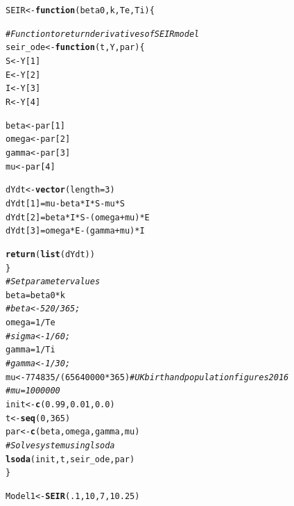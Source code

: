 \documentclass{article}\usepackage[]{graphicx}\usepackage[]{color}
\makeatletter
\newcommand{\hlnum}[1]{\textcolor[rgb]{0.686,0.059,0.569}{#1}}%
\newcommand{\hlcom}[1]{\textcolor[rgb]{0.678,0.584,0.686}{\textit{#1}}}%
\newcommand{\hlopt}[1]{\textcolor[rgb]{0,0,0}{#1}}%
\newcommand{\hlstd}[1]{\textcolor[rgb]{0.345,0.345,0.345}{#1}}%
\newcommand{\hlkwa}[1]{\textcolor[rgb]{0.161,0.373,0.58}{\textbf{#1}}}%
\newcommand{\hlkwb}[1]{\textcolor[rgb]{0.69,0.353,0.396}{#1}}%
\newcommand{\hlkwc}[1]{\textcolor[rgb]{0.333,0.667,0.333}{#1}}%
\newcommand{\hlkwd}[1]{\textcolor[rgb]{0.737,0.353,0.396}{\textbf{#1}}}%
\newenvironment{kframe}{%
 \def\at@end@of@kframe{}%
 \ifinner\ifhmode%
  \def\at@end@of@kframe{\end{minipage}}%
  \begin{minipage}{\columnwidth}%
 \fi\fi%
 \def\FrameCommand##1{\hskip\@totalleftmargin \hskip-\fboxsep
 \colorbox{shadecolor}{##1}\hskip-\fboxsep
     \hskip-\linewidth \hskip-\@totalleftmargin \hskip\columnwidth}%
 \MakeFramed {\advance\hsize-\width
   \@totalleftmargin\z@ \linewidth\hsize
   \@setminipage}}%
 {\par\unskip\endMakeFramed%
 \at@end@of@kframe}
\newenvironment{knitrout}{}{} %
\makeatother
\begin{document}
\begin{knitrout}
\color{fgcolor}\begin{kframe}
\begin{alltt}
\hlstd{SEIR} \hlkwb{<-} \hlkwa{function}\hlstd{(}\hlkwc{beta0}\hlstd{,} \hlkwc{k}\hlstd{,} \hlkwc{Te}\hlstd{,} \hlkwc{Ti}\hlstd{)\{}

\hlcom{# Function to return derivatives of SEIR model}
\hlstd{seir_ode}\hlkwb{<-}\hlkwa{function}\hlstd{(}\hlkwc{t}\hlstd{,}\hlkwc{Y}\hlstd{,}\hlkwc{par}\hlstd{)\{}
  \hlstd{S}\hlkwb{<-}\hlstd{Y[}\hlnum{1}\hlstd{]}
  \hlstd{E}\hlkwb{<-}\hlstd{Y[}\hlnum{2}\hlstd{]}
  \hlstd{I}\hlkwb{<-}\hlstd{Y[}\hlnum{3}\hlstd{]}
  \hlstd{R}\hlkwb{<-}\hlstd{Y[}\hlnum{4}\hlstd{]}

  \hlstd{beta}\hlkwb{<-}\hlstd{par[}\hlnum{1}\hlstd{]}
  \hlstd{omega}\hlkwb{<-}\hlstd{par[}\hlnum{2}\hlstd{]}
  \hlstd{gamma}\hlkwb{<-}\hlstd{par[}\hlnum{3}\hlstd{]}
  \hlstd{mu}\hlkwb{<-}\hlstd{par[}\hlnum{4}\hlstd{]}

  \hlstd{dYdt}\hlkwb{<-}\hlkwd{vector}\hlstd{(}\hlkwc{length}\hlstd{=}\hlnum{3}\hlstd{)}
  \hlstd{dYdt[}\hlnum{1}\hlstd{]}\hlkwb{=}\hlstd{mu}\hlopt{-}\hlstd{beta}\hlopt{*}\hlstd{I}\hlopt{*}\hlstd{S}\hlopt{-}\hlstd{mu}\hlopt{*}\hlstd{S}
  \hlstd{dYdt[}\hlnum{2}\hlstd{]}\hlkwb{=}\hlstd{beta}\hlopt{*}\hlstd{I}\hlopt{*}\hlstd{S}\hlopt{-}\hlstd{(omega}\hlopt{+}\hlstd{mu)}\hlopt{*}\hlstd{E}
  \hlstd{dYdt[}\hlnum{3}\hlstd{]}\hlkwb{=}\hlstd{omega}\hlopt{*}\hlstd{E}\hlopt{-}\hlstd{(gamma}\hlopt{+}\hlstd{mu)}\hlopt{*}\hlstd{I}

  \hlkwd{return}\hlstd{(}\hlkwd{list}\hlstd{(dYdt))}
\hlstd{\}}
  \hlcom{# Set parameter values}
\hlstd{beta} \hlkwb{=} \hlstd{beta0}\hlopt{*}\hlstd{k}
\hlcom{#beta<-520/365;}
\hlstd{omega} \hlkwb{=} \hlnum{1}\hlopt{/}\hlstd{Te}
\hlcom{# sigma<-1/60;}
\hlstd{gamma} \hlkwb{=} \hlnum{1}\hlopt{/}\hlstd{Ti}
\hlcom{# gamma<-1/30;}
\hlstd{mu}\hlkwb{<-}\hlnum{774835}\hlopt{/}\hlstd{(}\hlnum{65640000}\hlopt{*}\hlnum{365}\hlstd{)} \hlcom{# UK birth and population figures 2016}
\hlcom{# mu=1000000}
\hlstd{init}\hlkwb{<-}\hlkwd{c}\hlstd{(}\hlnum{0.99}\hlstd{,}\hlnum{0.01}\hlstd{,}\hlnum{0.0}\hlstd{)}
\hlstd{t}\hlkwb{<-}\hlkwd{seq}\hlstd{(}\hlnum{0}\hlstd{,}\hlnum{365}\hlstd{)}
\hlstd{par}\hlkwb{<-}\hlkwd{c}\hlstd{(beta,omega,gamma,mu)}
\hlcom{# Solve system using lsoda}
\hlkwd{lsoda}\hlstd{(init,t,seir_ode,par)}
\hlstd{\}}

\hlstd{Model1} \hlkwb{<-} \hlkwd{SEIR}\hlstd{(}\hlnum{.1}\hlstd{,} \hlnum{10}\hlstd{,} \hlnum{7}\hlstd{,} \hlnum{10.25}\hlstd{)}
\end{alltt}
\end{kframe}
\end{knitrout}
\end{document}

